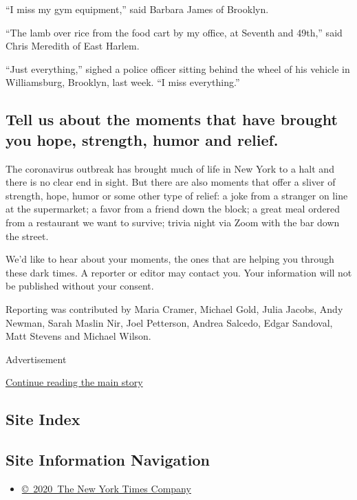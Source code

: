 ``I miss my gym equipment,'' said Barbara James of Brooklyn.

``The lamb over rice from the food cart by my office, at Seventh and
49th,'' said Chris Meredith of East Harlem.

``Just everything,'' sighed a police officer sitting behind the wheel of
his vehicle in Williamsburg, Brooklyn, last week. ``I miss everything.''

\hypertarget{tell-us-about-the-moments-that-have-brought-you-hope-strength-humor-and-relief}{%
\subsection{Tell us about the moments that have brought you hope,
strength, humor and
relief.}\label{tell-us-about-the-moments-that-have-brought-you-hope-strength-humor-and-relief}}

The coronavirus outbreak has brought much of life in New York to a halt
and there is no clear end in sight. But there are also moments that
offer a sliver of strength, hope, humor or some other type of relief: a
joke from a stranger on line at the supermarket; a favor from a friend
down the block; a great meal ordered from a restaurant we want to
survive; trivia night via Zoom with the bar down the street.

We'd like to hear about your moments, the ones that are helping you
through these dark times. A reporter or editor may contact you. Your
information will not be published without your consent.

Reporting was contributed by Maria Cramer, Michael Gold, Julia Jacobs,
Andy Newman, Sarah Maslin Nir, Joel Petterson, Andrea Salcedo, Edgar
Sandoval, Matt Stevens and Michael Wilson.

Advertisement

\protect\hyperlink{after-bottom}{Continue reading the main story}

\hypertarget{site-index}{%
\subsection{Site Index}\label{site-index}}

\hypertarget{site-information-navigation}{%
\subsection{Site Information
Navigation}\label{site-information-navigation}}

\begin{itemize}
\tightlist
\item
  \href{https://help.nytimes3xbfgragh.onion/hc/en-us/articles/115014792127-Copyright-notice}{©~2020~The
  New York Times Company}
\end{itemize}

